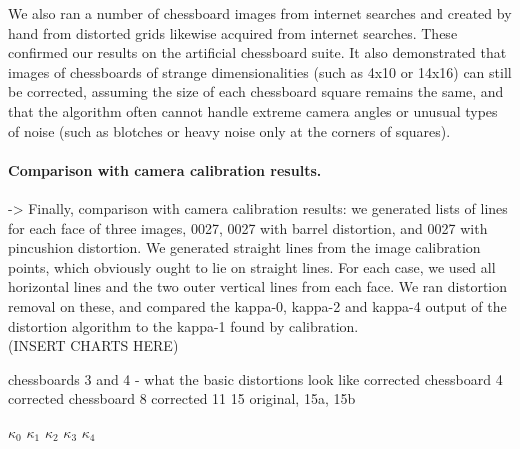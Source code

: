 We also ran a number of chessboard images from internet searches and created by hand from distorted grids likewise acquired from internet searches. These confirmed our results on the artificial chessboard suite. It also demonstrated that images of chessboards of strange dimensionalities (such as 4x10 or 14x16) can still be corrected, assuming the size of each chessboard square remains the same, and that the algorithm often cannot handle extreme camera angles or unusual types of noise (such as blotches or heavy noise only at the corners of squares).

\paragraph{Comparison with camera calibration results.}

-> Finally, comparison with camera calibration results: we generated lists of lines for each face of three images, 0027, 0027 with barrel distortion, and 0027 with pincushion distortion. We generated straight lines from the image calibration points, which obviously ought to lie on straight lines. For each case, we used all horizontal lines and the two outer vertical lines from each face. We ran distortion removal on these, and compared the kappa-0, kappa-2 and kappa-4 output of the distortion algorithm to the kappa-1 found by calibration.\\

(INSERT CHARTS HERE)


chessboards 3 and 4 - what the basic distortions look like
corrected chessboard 4
corrected chessboard 8
corrected 11
15 original, 15a, 15b


 $ \kappa_{0}$
 $ \kappa_{1}$
 $ \kappa_{2}$
 $ \kappa_{3}$
 $ \kappa_{4}$






